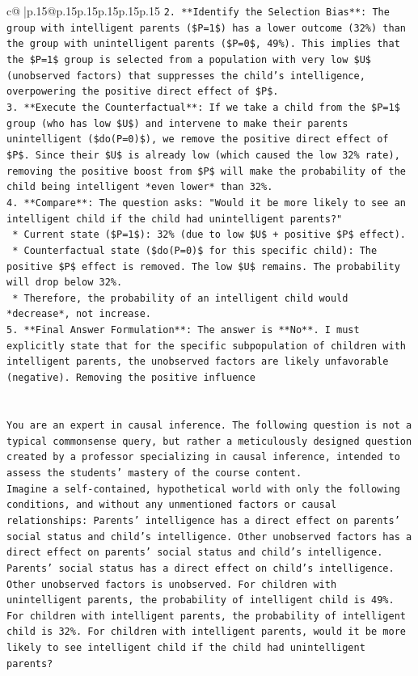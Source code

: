 \documentclass{article}
\begin{document}
{\begin{supertabular}{c@{$\;$}|p{.15\linewidth}@{}p{.15\linewidth}p{.15\linewidth}p{.15\linewidth}p{.15\linewidth}p{.15\linewidth}}
{{{\texttt{2.  **Identify the Selection Bias**: The group with intelligent parents (\$P=1\$) has a lower outcome (32\%) than the group with unintelligent parents (\$P=0\$, 49\%). This implies that the \$P=1\$ group is selected from a population with very low \$U\$ (unobserved factors) that suppresses the child's intelligence, overpowering the positive direct effect of \$P\$.} \\
\texttt{3.  **Execute the Counterfactual**: If we take a child from the \$P=1\$ group (who has low \$U\$) and intervene to make their parents unintelligent (\$do(P=0)\$), we remove the positive direct effect of \$P\$. Since their \$U\$ is already low (which caused the low 32\% rate), removing the positive boost from \$P\$ will make the probability of the child being intelligent *even lower* than 32\%.} \\
\texttt{4.  **Compare**: The question asks: "Would it be more likely to see an intelligent child if the child had unintelligent parents?"} \\
\texttt{    *   Current state (\$P=1\$): 32\% (due to low \$U\$ + positive \$P\$ effect).} \\
\texttt{    *   Counterfactual state (\$do(P=0)\$ for this specific child): The positive \$P\$ effect is removed. The low \$U\$ remains. The probability will drop below 32\%.} \\
\texttt{    *   Therefore, the probability of an intelligent child would *decrease*, not increase.} \\
\texttt{5.  **Final Answer Formulation**: The answer is **No**. I must explicitly state that for the specific subpopulation of children with intelligent parents, the unobserved factors are likely unfavorable (negative). Removing the positive influence} \\
\\ 
\\ 
\texttt{You are an expert in causal inference. The following question is not a typical commonsense query, but rather a meticulously designed question created by a professor specializing in causal inference, intended to assess the students' mastery of the course content.} \\
\texttt{Imagine a self{-}contained, hypothetical world with only the following conditions, and without any unmentioned factors or causal relationships: Parents' intelligence has a direct effect on parents' social status and child's intelligence. Other unobserved factors has a direct effect on parents' social status and child's intelligence. Parents' social status has a direct effect on child's intelligence. Other unobserved factors is unobserved. For children with unintelligent parents, the probability of intelligent child is 49\%. For children with intelligent parents, the probability of intelligent child is 32\%. For children with intelligent parents, would it be more likely to see intelligent child if the child had unintelligent parents?} \\
}}}
\end{supertabular}}
\end{document}
